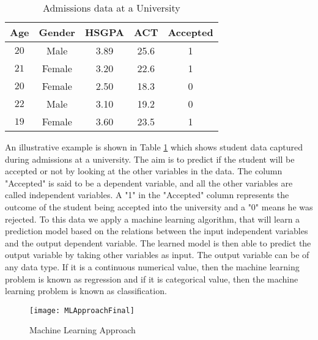 \documentclass[11pt,openright]{report}
\begin{document}
 \begin{table}[!t]
	\renewcommand{\arraystretch}{1.3}
	\caption{Admissions data at a University}
	\label{table:example_db}
	\centering
	\begin{tabular}{|c|c|c|c|c|}
		\hline
		\bfseries Age & \bfseries Gender & \bfseries HSGPA & \bfseries ACT & \bfseries Accepted\\
		\hline
		$20$ & Male & 3.89 & 25.6 & 1\\ \hline
		$21$ & Female & 3.20 & 22.6 & 1\\ \hline
		$20$ & Female & 2.50 & 18.3 & 0\\ \hline
		$22$ & Male & 3.10 &  19.2 & 0\\ \hline
		$19$ & Female & 3.60 & 23.5 & 1\\ \hline
	\end{tabular}
\end{table}


An illustrative example is shown in Table \ref{table:example_db} which shows student data captured during admissions at a university. The aim is to predict if the student will be accepted or not by looking at the other variables in the data. The column "Accepted" is said to be a dependent variable, and all the other variables are called independent variables. A "1" in the "Accepted" column represents the outcome of the student being accepted into the university and a "0" means he was rejected. To this data we apply a machine learning algorithm, that will learn a prediction model based on the relations between the input independent variables and the output dependent variable. The learned model is then able to predict the output variable by taking other variables as input. The output variable can be of any data type. If it is a continuous numerical value, then the machine learning problem is known as regression and if it is categorical value, then the machine learning problem is known as classification.
  \begin{figure}
	\centering
	\texttt{[image: MLApproachFinal]}
	\caption{Machine Learning Approach}
	\label{fig:predictive_analysis-approach}
\end{figure} 
\end{document}
